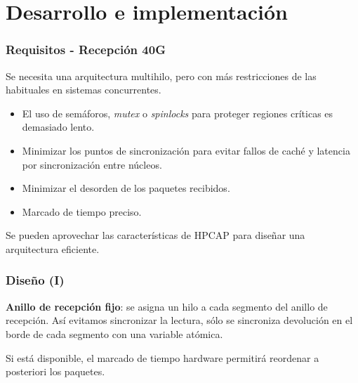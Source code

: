\documentclass[10pt,notes,compress,usetitleprogressbar,aspectratio=1610]{beamer}
\begin{document}
\section{Desarrollo e implementación} 

\begin{frame}
\frametitle{Requisitos - Recepción 40G}


Se necesita una arquitectura multihilo, pero con más restricciones de las habituales en sistemas concurrentes.

\begin{itemize}
\item El uso de semáforos, \textit{mutex} o \textit{spinlocks} para proteger regiones críticas es demasiado lento. 
\item Minimizar los puntos de sincronización para evitar fallos de caché y latencia por sincronización entre núcleos.
\item Minimizar el desorden de los paquetes recibidos.
\item Marcado de tiempo preciso.
\end{itemize}

Se pueden aprovechar las características de HPCAP para diseñar una arquitectura eficiente.
\end{frame}

\begin{frame}
\frametitle{Diseño (I)}

\begin{figure}
\centering

\end{figure}

\textbf{Anillo de recepción fijo}: se asigna un hilo a cada segmento del anillo de recepción. Así evitamos sincronizar la lectura, sólo se sincroniza devolución en el borde de cada segmento con una variable atómica. 

Si está disponible, el marcado de tiempo hardware permitirá reordenar a posteriori los paquetes. 

\end{frame}
\end{document}
